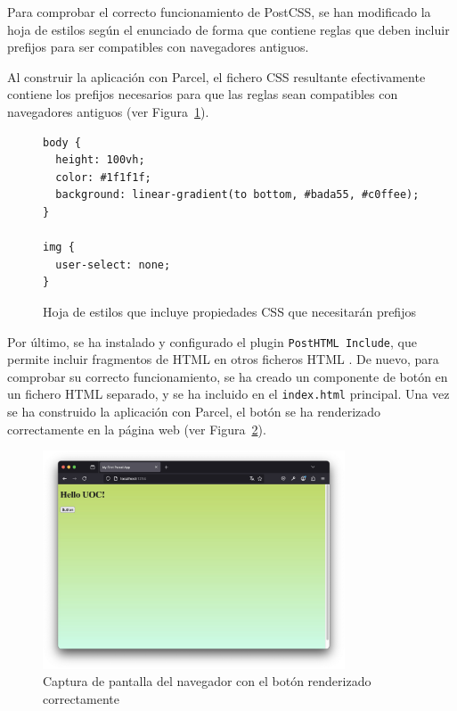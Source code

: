 \documentclass{article}
\begin{document}
Para comprobar el correcto funcionamiento de PostCSS, se han modificado la hoja de estilos según el enunciado de forma que contiene reglas que deben incluir prefijos para ser compatibles con navegadores antiguos.

Al construir la aplicación con Parcel, el fichero CSS resultante efectivamente contiene los prefijos necesarios para que las reglas sean compatibles con navegadores antiguos (ver Figura~\ref{fig:styles-css}).

\begin{figure}[h!]
\begin{verbatim}
body {
  height: 100vh;
  color: #1f1f1f;
  background: linear-gradient(to bottom, #bada55, #c0ffee);
}

img {
  user-select: none;
}
\end{verbatim}
\caption{Hoja de estilos que incluye propiedades CSS que necesitarán prefijos}
\label{fig:styles-css}
\end{figure}

Por último, se ha instalado y configurado el plugin \lstinline|PostHTML Include|, que permite incluir fragmentos de HTML en otros ficheros HTML .
De nuevo, para comprobar su correcto funcionamiento, se ha creado un componente de botón en un fichero HTML separado, y se ha incluido en el \lstinline|index.html| principal.
Una vez se ha construido la aplicación con Parcel, el botón se ha renderizado correctamente en la página web (ver Figura~\ref{fig:posthtml-include}).

\begin{figure}[h!]
    \centering
    \includegraphics[width=0.8\textwidth]{./img/after-posthtml-include}
    \caption{Captura de pantalla del navegador con el botón renderizado correctamente}
    \label{fig:posthtml-include}
\end{figure}
\end{document}
